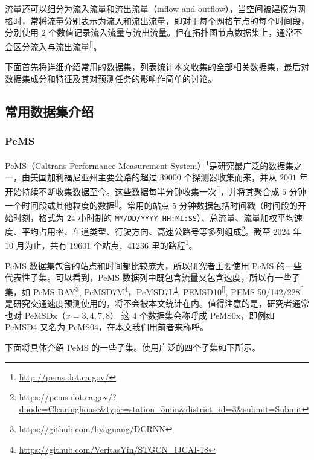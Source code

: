 \documentclass{ctexart}
\renewcommand{\cite}[1]{\textsuperscript{[\citenum{#1}]}}
\begin{document}
流量还可以细分为流入流量和流出流量（inflow and outflow），当空间被建模为网格时，常将流量分别表示为流入和流出流量，即对于每个网格节点的每个时间段，分别使用 $2$ 个数值记录流入流量与流出流量。但在拓扑图节点数据集上，通常不会区分流入与流出流量\cite{T-ZS45}。

下面首先将详细介绍常用的数据集，列表统计本文收集的全部相关数据集，最后对数据集成分和特征及其对预测任务的影响作简单的讨论。

\subsection{常用数据集介绍}
\subsubsection{PeMS}
PeMS（Caltrans Performance Measurement System）\footnote{\url{http://pems.dot.ca.gov/}\label{pems}}是研究最广泛的数据集之一，由美国加利福尼亚州主要公路的超过 $39000$ 个探测器收集而来，并从 $2001$ 年开始持续不断收集数据至今。这些数据每半分钟收集一次\cite{T-ZS2}，并将其聚合成 $5$ 分钟一个时间段或其他粒度的数据\cite{T-ZS1}。常用的站点 $5$ 分钟数据包括时间戳（时间段的开始时刻，格式为 $24$ 小时制的 \verb|MM/DD/YYYY HH:MI:SS|）、总流量、流量加权平均速度、平均占用率、车道类型、行驶方向、高速公路号等多列组成\footnote{\url{https://pems.dot.ca.gov/?dnode=Clearinghouse&type=station_5min&district_id=3&submit=Submit}}。截至 $2024$ 年 $10$ 月为止，共有 $19601$ 个站点、$41236$ 里的路程\textsuperscript{\ref{pems}}。

PeMS 数据集包含的站点和时间都比较庞大，所以研究者主要使用 PeMS 的一些代表性子集。可以看到，PeMS 数据列中既包含流量又包含速度，所以有一些子集，如 PeMS-BAY\footnote{\url{https://github.com/liyaguang/DCRNN}\label{pems-bay}}, PeMSD7M\footnote{\url{https://github.com/VeritasYin/STGCN_IJCAI-18}\label{pemsd7ml}}，PeMSD7L\textsuperscript{\ref{pemsd7ml}}, PEMSD10\cite{T-69}, PEMS-50/142/228\cite{T-109} 是研究交通速度预测使用的，将不会被本文统计在内。值得注意的是，研究者通常也对 PeMSDx（$x=3,4,7,8$） 这 $4$ 个数据集会称呼成 PeMS0x，即例如 PeMSD4 又名为 PeMS04，在本文我们用前者来称呼。


下面将具体介绍 PeMS 的一些子集。使用广泛的四个子集如下所示。
\end{document}
